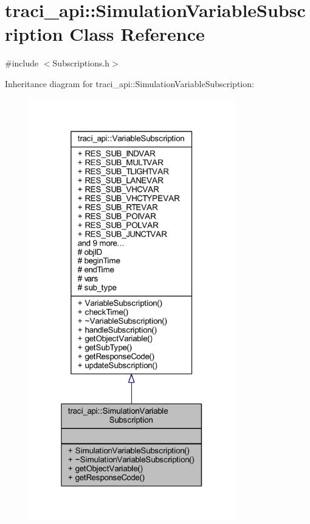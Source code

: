 \hypertarget{classtraci__api_1_1_simulation_variable_subscription}{}\section{traci\+\_\+api\+:\+:Simulation\+Variable\+Subscription Class Reference}
\label{classtraci__api_1_1_simulation_variable_subscription}


{\ttfamily \#include $<$Subscriptions.\+h$>$}



Inheritance diagram for traci\+\_\+api\+:\+:Simulation\+Variable\+Subscription\+:
\nopagebreak
\begin{figure}[H]
\begin{center}
\leavevmode
\includegraphics[width=253pt]{classtraci__api_1_1_simulation_variable_subscription__inherit__graph}
\end{center}
\end{figure}


